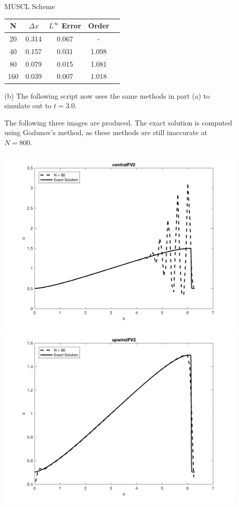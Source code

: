 \documentclass[11pt, oneside]{article}
\begin{document}
\begin{enumerate}
\begin{enumerate}
        \begin{center}
          MUSCL Scheme \\
          \begin{tabular}{*{5}{c}}
            \toprule
            N & $\Delta x$ & $L^{\infty}$ Error & Order \\
            \midrule
            20 & 0.314 & 0.067 & - \\
            40 & 0.157 & 0.031 & 1.098 \\
            80 & 0.079 & 0.015 & 1.081 \\
            160 & 0.039 & 0.007 & 1.018 \\
            \bottomrule
          \end{tabular}
        \end{center}

      \item[(b)]
        The following script now uses the same methods in part (a) to simulate
        out to $t = 3.0$.
        
        The following three images are produced.
        The exact solution is computed using Godunov's method, as these methods
        are still inaccurate at $N = 800$.
        \begin{center}
          \includegraphics[scale=0.5]{Figures/06_01.png}
          \includegraphics[scale=0.5]{Figures/06_02.png}

\end{center}
\end{enumerate}
\end{enumerate}
\end{document}
